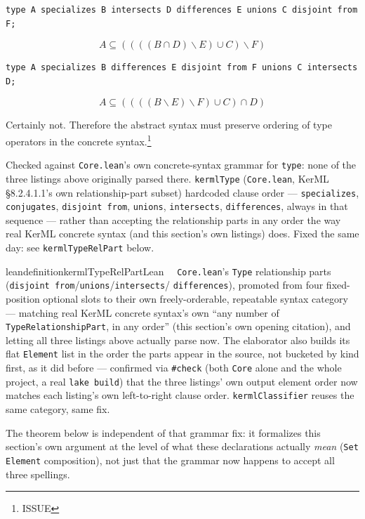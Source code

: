 \begin{lstlisting}
type A specializes B intersects D differences E unions C disjoint from F;
\end{lstlisting}
\[ A \subseteq (((( B \cap D)\backslash E)\cup C)\backslash F) \]

\begin{lstlisting}
type A specializes B differences E disjoint from F unions C intersects D;
\end{lstlisting}
\[ A \subseteq (((( B\backslash E)\backslash F)  \cup C) \cap D)\]

\pn Certainly not.  Therefore the abstract syntax must preserve ordering of type operators in the concrete syntax.\footnote{ISSUE}

\pn Checked against \texttt{Core.lean}'s own concrete-syntax grammar for \texttt{type}: none of the three
listings above originally parsed there. \texttt{kermlType} (\texttt{Core.lean}, KerML \S8.2.4.1.1's own
relationship-part subset) hardcoded clause order --- \texttt{specializes}, \texttt{conjugates},
\texttt{disjoint from}, \texttt{unions}, \texttt{intersects}, \texttt{differences}, always in that sequence
--- rather than accepting the relationship parts in any order the way real KerML concrete syntax (and this
section's own listings) does. Fixed the same day: see \texttt{kermlTypeRelPart} below.

\begin{restatable}{leandefinition}{kermlTypeRelPartLean}~~ \texttt{Core.lean}'s
\texttt{Type} relationship parts (\texttt{disjoint from}/\texttt{unions}/\texttt{intersects}/
\texttt{differences}), promoted from four fixed-position optional slots to their own freely-orderable,
repeatable syntax category --- matching real KerML concrete syntax's own ``any number of
\texttt{TypeRelationshipPart}, in any order'' (this section's own opening citation), and letting all three
listings above actually parse now. The elaborator also builds its flat \texttt{Element} list in the order
the parts appear in the source, not bucketed by kind first, as it did before --- confirmed via \texttt{\#check}
(both \texttt{Core} alone and the whole project, a real \texttt{lake build}) that the three listings' own
output element order now matches each listing's own left-to-right clause order. \texttt{kermlClassifier}
reuses the same category, same fix.
\label{kermlTypeRelPart}
\end{restatable}

\pn The theorem below is independent of that grammar fix: it formalizes this section's own argument at the
level of what these declarations actually \emph{mean} (\texttt{Set Element} composition), not just that the
grammar now happens to accept all three spellings.

